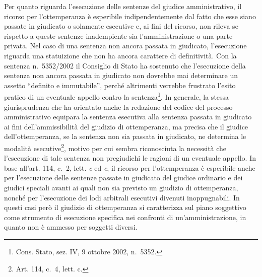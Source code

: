 \documentclass[12pt,it,a4paper,]{report}
\begin{document}
Per quanto riguarda l'esecuzione delle sentenze del giudice
amministrativo, il ricorso per l'ottemperanza è esperibile
indipendentemente dal fatto che esse siano passate in giudicato o
solamente esecutive e, ai fini del ricorso, non rileva se rispetto a
queste sentenze inadempiente sia l'amministrazione o una parte privata.
Nel caso di una sentenza non ancora passata in giudicato, l'esecuzione
riguarda una statuizione che non ha ancora carattere di definitività.
Con la sentenza n.~5352/2002 il Consiglio di Stato ha sostenuto che
l'esecuzione della sentenza non ancora passata in giudicato non dovrebbe
mai determinare un assetto ``definito e immutabile'', perché altrimenti
verrebbe frustrato l'esito pratico di un eventuale appello contro la
sentenza\footnote{Cons. Stato, sez. IV, 9 ottobre 2002, n.~5352.}. In
generale, la stessa giurisprudenza che ha orientato anche la redazione
del codice del processo amministrativo equipara la sentenza esecutiva
alla sentenza passata in giudicato ai fini dell'ammissibilità del
giudizio di ottemperanza, ma precisa che il giudice dell'ottemperanza,
se la sentenza non sia passata in giudicato, ne determina le modalità
esecutive\footnote{Art. 114, c.~4, lett. c.}, motivo per cui sembra
riconosciuta la necessità che l'esecuzione di tale sentenza non
pregiudichi le ragioni di un eventuale appello. In base all'art. 114,
c.~2, lett. \emph{c} ed \emph{e}, il ricorso per l'ottemperanza è
esperibile anche per l'esecuzione delle sentenze passate in giudicato
del giudice ordinario e dei giudici speciali avanti ai quali non sia
previsto un giudizio di ottemperanza, nonché per l'esecuzione dei lodi
arbitrali esecutivi divenuti inoppugnabili. In questi casi però il
giudizio di ottemperanza si caratterizza sul piano soggettivo come
strumento di esecuzione specifica nei confronti di un'amministrazione,
in quanto non è ammesso per soggetti diversi.
\end{document}
